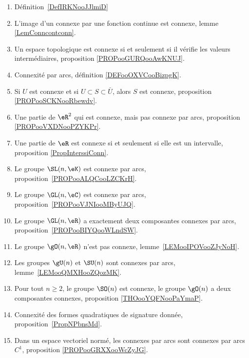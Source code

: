 \begin{enumerate}
	\item
	      Définition~\ref{DefIRKNooJJlmiD}
	\item
	      L'image d'un connexe par une fonction continue est connexe, lemme \ref{LemConncontconn}.
	\item
	      Un espace topologique est connexe si et seulement si il vérifie les valeurs intermédiaires, proposition \ref{PROPooGURQooAwKNUJ}.
	\item
	      Connexité par arcs, définition \ref{DEFooOXVCooBizpgK}.
	\item
	      Si \( U\) est connexe et si \( U\subset S\subset \bar U\), alors \( S\) est connexe, proposition \ref{PROPooSCKNooRbewdv}.
	\item
	      Une partie de \( \eR^2\) qui est connexe, mais pas connexe par arcs, proposition \ref{PROPooVXDNooPZYKPr}.
	\item
	      Une partie de \( \eR\) est connexe si et seulement si elle est un intervalle, proposition \ref{PropInterssiConn}.
	\item
	      Le groupe \( \SL(n,\eK)\) est connexe par arcs, proposition~\ref{PROPooALQCooLZCKrH}.
	\item
	      Le groupe \( \GL(n,\eC)\) est connexe par arcs, proposition~\ref{PROPooVJNIooMByUJQ}.
	\item
	      Le groupe \( \GL(n,\eR)\) a exactement deux composantes connexes par arcs, proposition~\ref{PROPooBIYQooWLndSW}.
	\item
	      Le groupe \( \gO(n,\eR)\) n'est pas connexe, lemme~\ref{LEMooIPOVooZJyNoH}.
	\item
	      Les groupes \( \gU(n)\) et \( \SU(n)\) sont connexes par arcs, lemme~\ref{LEMooQMXHooZQozMK}.
	\item
	      Pour tout \( n\geq 2\), le groupe \( \SO(n)\) est connexe, le groupe \( \gO(n)\) a deux composantes connexes, proposition \ref{THOooYQFNooPaYmaP}.
	\item
	      Connexité des formes quadratiques de signature donnée, proposition~\ref{PropNPbnsMd}.
	\item
	      Dans un espace vectoriel normé, les connexes par arcs sont connexes par arcs \( C^1\), proposition \ref{PROPooGRXXooWcZyJG}.
\end{enumerate}

